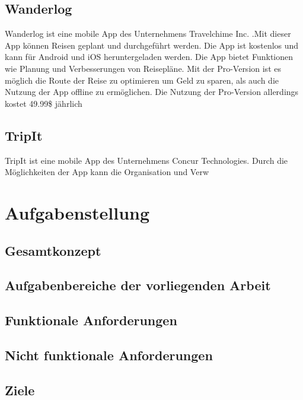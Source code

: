 \subsection{Wanderlog}
Wanderlog ist eine mobile App des Unternehmens Travelchime Inc. .Mit dieser App können Reisen geplant und durchgeführt werden. Die App ist kostenlos und kann für Android und iOS heruntergeladen werden. Die App bietet Funktionen wie Planung und Verbesserungen von Reisepläne. Mit der Pro-Version ist es möglich die Route der Reise zu optimieren um Geld zu sparen, als auch die Nutzung der App offline zu ermöglichen. Die Nutzung der Pro-Version allerdings kostet 49.99\$ jährlich
\cite{}

\subsection{TripIt}
TripIt ist eine mobile App des Unternehmens Concur Technologies. Durch die Möglichkeiten der App kann die Organisation und Verw
\cite{}

\section{Aufgabenstellung}


\begin{spacing}{2}
\subsection{Gesamtkonzept}
\end{spacing}

\begin{spacing}{2}
\subsection{Aufgabenbereiche der vorliegenden Arbeit}
\end{spacing}

\begin{spacing}{2}
\subsection{Funktionale Anforderungen}
\end{spacing}

\begin{spacing}{2}
\subsection{Nicht funktionale Anforderungen}
\end{spacing}

\begin{spacing}{2}
\section{Ziele}
\end{spacing}
    
